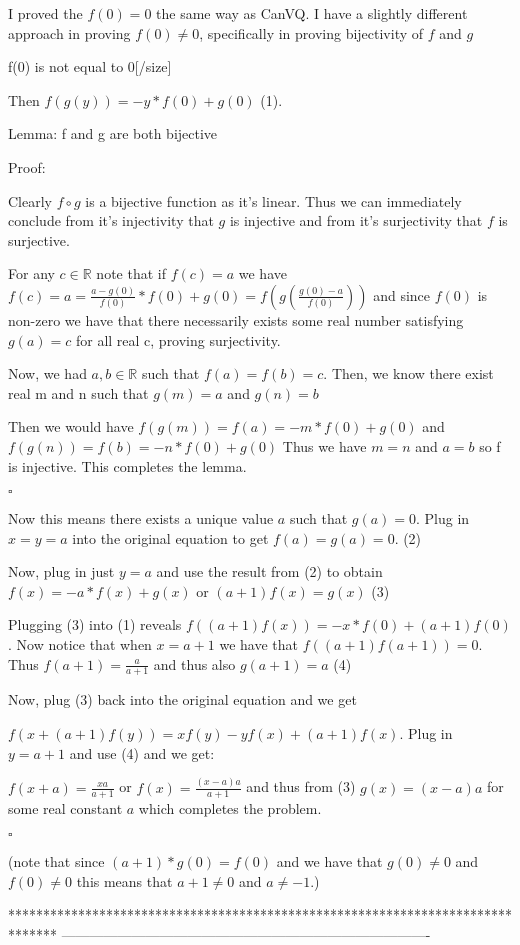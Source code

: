 \begin{mysolution}
	I proved the $f(0) = 0$ the same way as CanVQ. I have a slightly different approach in proving $f(0) \neq 0$, specifically in proving bijectivity of $f$ and $g$ 

\begin{bolded}[size=150]f(0) is not equal to 0[/size]\end{bolded}

Then $f(g(y)) = -y*f(0) + g(0)$ (1). 

\begin{bolded}Lemma: f and g are both bijective\end{bolded}

Proof:

Clearly $f \circ g$ is a bijective function as it's linear. Thus we can immediately conclude from it's injectivity that $g$ is injective and from it's surjectivity that $f$ is surjective. 

For any $c \in \mathbb{R}$ note that if $f(c) = a$ we have $f(c) = a = \frac{a-g(0)}{f(0)} * f(0) + g(0) = f(g(\frac{g(0)-a}{f(0)}))$ and since $f(0)$ is non-zero we have that there necessarily exists some real number satisfying $g(a) = c$ for all real c, proving surjectivity.

Now, we had $a,b \in \mathbb{R}$ such that $f(a) = f(b) = c$. Then, we know there exist real m and n such that $g(m) = a$ and $g(n) = b$ 

Then we would have $f(g(m)) = f(a) = -m*f(0) + g(0)$ and $f(g(n)) = f(b) = -n*f(0)+g(0)$ Thus we have $m=n$ and $a=b$ so f is injective. This completes the lemma. 

$\square$

Now this means there exists a unique value $a$ such that $g(a) = 0$. Plug in $x=y=a$ into the original equation to get $f(a) = g(a) = 0$. (2)

Now, plug in just $y=a$ and use the result from (2) to obtain $f(x) = -a*f(x) + g(x)$ or $(a+1)f(x) = g(x)$ (3)

Plugging (3) into (1) reveals $f((a+1)f(x)) = -x*f(0)+(a+1)f(0)$. Now notice that when $x=a+1$ we have that $f((a+1)f(a+1)) = 0$. Thus $f(a+1) = \frac{a}{a+1}$ and thus also $g(a+1) = a$ (4)

Now, plug (3) back into the original equation and we get

$f(x+(a+1)f(y)) = xf(y) - yf(x)+(a+1)f(x)$. Plug in $y=a+1$ and use (4) and we get:

$f(x+a) = \frac{xa}{a+1}$ or $f(x) = \frac{(x-a)a}{a+1}$ and thus from (3) $g(x) = (x-a)a$ for some real constant $a$ which completes the problem.

$\square$

(note that since $(a+1)*g(0) = f(0)$ and we have that $g(0) \neq 0$ and $f(0) \neq 0$ this means that $a + 1 \neq 0$ and $a \neq -1$.)
\end{mysolution}
*******************************************************************************
-------------------------------------------------------------------------------

